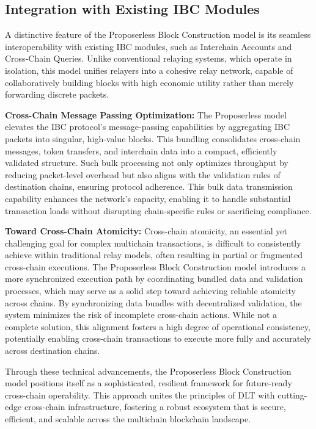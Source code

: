 \documentclass{article}
\begin{document}
\subsection*{Integration with Existing IBC Modules}

A distinctive feature of the Proposerless Block Construction model is its seamless interoperability with existing IBC modules, such as Interchain Accounts and Cross-Chain Queries. Unlike conventional relaying systems, which operate in isolation, this model unifies relayers into a cohesive relay network, capable of collaboratively building blocks with high economic utility rather than merely forwarding discrete packets.

\textbf{Cross-Chain Message Passing Optimization:} The Proposerless model elevates the IBC protocol’s message-passing capabilities by aggregating IBC packets into singular, high-value blocks. This bundling consolidates cross-chain messages, token transfers, and interchain data into a compact, efficiently validated structure. Such bulk processing not only optimizes throughput by reducing packet-level overhead but also aligns with the validation rules of destination chains, ensuring protocol adherence. This bulk data transmission capability enhances the network’s capacity, enabling it to handle substantial transaction loads without disrupting chain-specific rules or sacrificing compliance.

\textbf{Toward Cross-Chain Atomicity:} Cross-chain atomicity, an essential yet challenging goal for complex multichain transactions, is difficult to consistently achieve within traditional relay models, often resulting in partial or fragmented cross-chain executions. The Proposerless Block Construction model introduces a more synchronized execution path by coordinating bundled data and validation processes, which may serve as a solid step toward achieving reliable atomicity across chains. By synchronizing data bundles with decentralized validation, the system minimizes the risk of incomplete cross-chain actions. While not a complete solution, this alignment fosters a high degree of operational consistency, potentially enabling cross-chain transactions to execute more fully and accurately across destination chains.

Through these technical advancements, the Proposerless Block Construction model positions itself as a sophisticated, resilient framework for future-ready cross-chain operability. This approach unites the principles of DLT with cutting-edge cross-chain infrastructure, fostering a robust ecosystem that is secure, efficient, and scalable across the multichain blockchain landscape.
\end{document}
